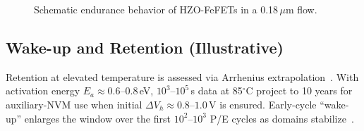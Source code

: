 \documentclass[journal]{IEEEtran}
\begin{document}
\begin{figure}[!t]
\centering
{}
\caption{Schematic endurance behavior of HZO-FeFETs in a 0.18\,$\mu$m flow.}
\label{fig:endurance}
\end{figure}

\subsection*{Wake-up and Retention (Illustrative)}
Retention at elevated temperature is assessed via Arrhenius extrapolation~\cite{Yamazaki2018}. With activation energy $E_a\!\approx\!0.6$--$0.8$\,eV, $10^3$--$10^5$\,s data at 85$^\circ$C project to 10 years for auxiliary-NVM use when initial $\Delta V_h\!\approx\!0.8$--$1.0$\,V is ensured. Early-cycle “wake-up” enlarges the window over the first $10^2$–$10^3$ P/E cycles as domains stabilize~\cite{Boscke2011,Mueller2012}.
\end{document}
